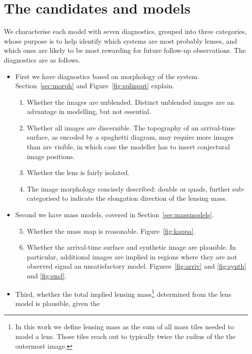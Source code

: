 \section{The candidates and models}

We characterise each model with seven diagnostics, grouped into three 
categories, whose purpose is to help identify which systems are most probably 
lenses, and which ones are likely to be most rewarding for future follow-up 
observations. The diagnostics are as follows.

\begin{itemize}
\item First we have diagnostics based on morphology of the
  system.
  Section~\ref{sec:morph} and Figure~\ref{fig:splinput} explain.
\begin{enumerate}
\item Whether the images are unblended.  Distinct unblended images are
  an advantage in modelling, but not essential.
\item Whether all images are discernible.  The topography of an
  arrival-time surface, as encoded by a spaghetti diagram, may require
  more images than are visible, in which case the modeller has to
  insert conjectural image positions.
\item Whether the lens is fairly isolated.
\item The image morphology concisely described: double or quads,
  further sub-categorised to indicate the elongation direction of the
  lensing mass.
\end{enumerate}
\item Second we have mass models, covered in Section~\ref{sec:massmodels}.
\begin{enumerate}
\setcounter{enumi}{4}
\item Whether the mass map is reasonable. Figure~\ref{fig:kappa}.
\item Whether the arrival-time surface and synthetic image are
  plausible.  In particular, additional images are implied in regions
  where they are not observed signal an unsatisfactory model.
  Figures~\ref{fig:arriv} and \ref{fig:synth} and \ref{fig:encl}.
\end{enumerate}
\item Third, whether the total implied lensing mass\footnote{
    In this work we define lensing mass as the sum of all mass tiles
    needed to model a lens. Those tiles reach out to typically twice
    the radius of the the outermost image. }
  determined from the lens model is plausible, given the

\end{itemize}
